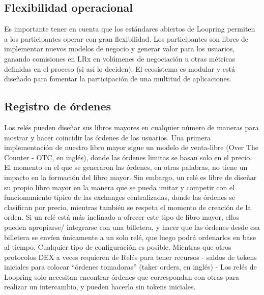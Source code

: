 \documentclass[UTF8,nofonts]{article}
\begin{document}
\begin{multicols}{2}
\section{Flexibilidad operacional\label{sec:business_model}}
Es importante tener en cuenta que los est\'andares abiertos de Loopring permiten a los participantes operar con gran flexibilidad. Los participantes son libres de implementar nuevos modelos de negocio y generar valor para los usuarios, ganando comisiones en LRx en vol\'umenes de negociaci\'on u otras m\'etricas definidas en el proceso (si as\'i lo deciden). El ecosistema es modular y est\'a dise\~nado para fomentar la participaci\'on de una multitud de aplicaciones.

\subsection{Registro de \'ordenes \label{sec:order_book}}
Los rel\'es pueden dise\~nar sus libros mayores en cualquier n\'umero de maneras para mostrar y hacer coincidir las \'ordenes de los usuarios. Una primera implementaci\'on de nuestro libro mayor sigue un modelo de venta-libre (Over The Counter - OTC, en ingl\'es), donde las \'ordenes limitas se basan solo en el precio. El momento en el que se generaron las \'ordenes, en otras palabras, no tiene un impacto en la formaci\'on del libro mayor. Sin embargo, un rel\'e es libre de dise\~nar su propio libro mayor en la manera que se pueda imitar y competir con el funcionamiento t\'ipico de las exchanges centralizadas, donde las \'ordenes se clasifican por precio, mientras tambi\'en se respeta el momento de creaci\'on de la orden. Si un rel\'e est\'a m\'as inclinado a ofrecer este tipo de libro mayor, ellos pueden apropiarse/ integrarse con una billetera, y hacer que las \'ordenes desde esa billetera se env\'ien \'unicamente a un solo rel\'e, que luego podr\'a ordenarlos en base al tiempo. Cualquier tipo de configuraci\'on es posible. 
Mientras que otros protocolos DEX a veces requieren de Rel\'es para tener recursos - saldos de tokens iniciales para colocar \enquote{\'ordenes tomadoras} (taker orders, en ingl\'es) - Los rel\'es de Loopring solo necesitan encontrar \'ordenes que correspondan con otras para realizar un intercambio, y pueden hacerlo sin tokens iniciales.



\end{multicols}
\end{document}
